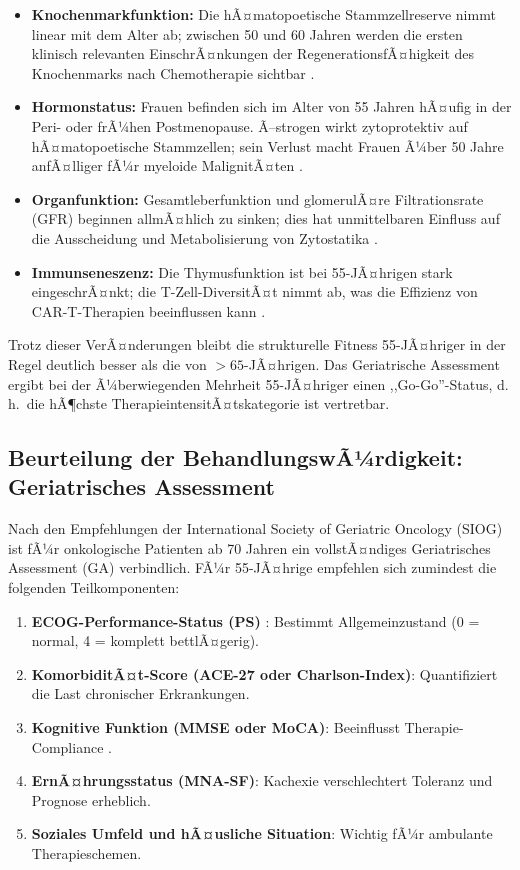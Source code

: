﻿\documentclass[12pt,a4paper]{article}
\theoremstyle{definition}
\begin{document}
\begin{itemize}
  \item \textbf{Knochenmarkfunktion:} Die hÃ¤matopoetische Stammzellreserve nimmt
        linear mit dem Alter ab; zwischen 50 und 60 Jahren werden die ersten
        klinisch relevanten EinschrÃ¤nkungen der RegenerationsfÃ¤higkeit des
        Knochenmarks nach Chemotherapie sichtbar \cite{appelbaum2006}.
  \item \textbf{Hormonstatus:} Frauen befinden sich im Alter von 55 Jahren
        hÃ¤ufig in der Peri- oder frÃ¼hen Postmenopause. Ã–strogen wirkt zytoprotektiv
        auf hÃ¤matopoetische Stammzellen; sein Verlust macht Frauen Ã¼ber 50 Jahre
        anfÃ¤lliger fÃ¼r myeloide MalignitÃ¤ten \cite{cook2009}.
  \item \textbf{Organfunktion:} Gesamtleberfunktion und glomerulÃ¤re Filtrationsrate
        (GFR) beginnen allmÃ¤hlich zu sinken; dies hat unmittelbaren Einfluss auf
        die Ausscheidung und Metabolisierung von Zytostatika \cite{extermann2007}.
  \item \textbf{Immunseneszenz:} Die Thymusfunktion ist bei 55-JÃ¤hrigen stark
        eingeschrÃ¤nkt; die T-Zell-DiversitÃ¤t nimmt ab, was die Effizienz
        von CAR-T-Therapien beeinflussen kann \cite{klepin2013}.
\end{itemize}

Trotz dieser VerÃ¤nderungen bleibt die strukturelle Fitness 55-JÃ¤hriger in der Regel
deutlich besser als die von $>65$-JÃ¤hrigen. Das Geriatrische Assessment
\cite{wildiers2014} ergibt bei der Ã¼berwiegenden Mehrheit 55-JÃ¤hriger einen
,,Go-Go''-Status, d.\,h.\ die hÃ¶chste TherapieintensitÃ¤tskategorie ist vertretbar.

\subsection{Beurteilung der BehandlungswÃ¼rdigkeit: Geriatrisches Assessment}

Nach den Empfehlungen der International Society of Geriatric Oncology (SIOG)
\cite{wildiers2014} ist fÃ¼r onkologische Patienten ab 70 Jahren ein vollstÃ¤ndiges
Geriatrisches Assessment (GA) verbindlich. FÃ¼r 55-JÃ¤hrige empfehlen sich zumindest
die folgenden Teilkomponenten:

\begin{enumerate}
  \item \textbf{ECOG-Performance-Status (PS)} \cite{oken1982}: Bestimmt
        Allgemeinzustand (0 = normal, 4 = komplett bettlÃ¤gerig).
  \item \textbf{KomorbiditÃ¤t-Score (ACE-27 oder Charlson-Index)}: Quantifiziert
        die Last chronischer Erkrankungen.
  \item \textbf{Kognitive Funktion (MMSE oder MoCA)}: Beeinflusst Therapie-
        Compliance \cite{klepin2013}.
  \item \textbf{ErnÃ¤hrungsstatus (MNA-SF)}: Kachexie verschlechtert Toleranz
        und Prognose erheblich.
  \item \textbf{Soziales Umfeld und hÃ¤usliche Situation}: Wichtig fÃ¼r
        ambulante Therapieschemen.
\end{enumerate}
\end{document}
